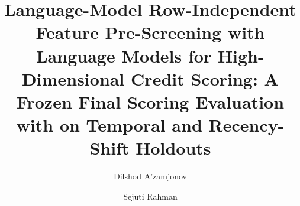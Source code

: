 \documentclass[final,5p,twocolumn]{elsarticle}
\providecommand{\DIFaddtex}[1]{{\protect\color{blue} \sf #1}} %
\providecommand{\DIFdeltex}[1]{{\protect\color{red} \scriptsize #1}} %
\providecommand{\DIFaddbegin}{} %
\providecommand{\DIFaddend}{} %
\providecommand{\DIFdelbegin}{} %
\providecommand{\DIFdelend}{} %
\providecommand{\DIFadd}[1]{\texorpdfstring{\DIFaddtex{#1}}{#1}} %
\providecommand{\DIFdel}[1]{\texorpdfstring{\DIFdeltex{#1}}{}} %
\begin{document}
\begin{frontmatter}

\title{\DIFdelbegin \DIFdel{Language-Model }\DIFdelend \DIFaddbegin \DIFadd{Row-Independent }\DIFaddend Feature Pre-Screening \DIFaddbegin \DIFadd{with Language Models }\DIFaddend for \DIFaddbegin \DIFadd{High-Dimensional }\DIFaddend Credit Scoring: A Frozen \DIFdelbegin \DIFdel{Final Scoring }\DIFdelend Evaluation \DIFdelbegin \DIFdel{with }\DIFdelend \DIFaddbegin \DIFadd{on }\DIFaddend Temporal and Recency-Shift Holdouts}

\author[aff1,aff3]{Dilshod A'zamjonov}

\author[aff2]{Sejuti Rahman}


\address[aff1]{Department of Engineering, New Uzbekistan University, 1 Movarounnahr Street, Mirzo Ulugbek District, Tashkent, Uzbekistan}
\address[aff2]{Department of Computing, New Uzbekistan University, 1 Movarounnahr Street, Mirzo Ulugbek District, Tashkent, Uzbekistan}
\address[aff3]{Central Bank of the Republic of Uzbekistan, 6 Islam Karimov Street, Tashkent 100001, Uzbekistan}


\end{frontmatter}
\end{document}
